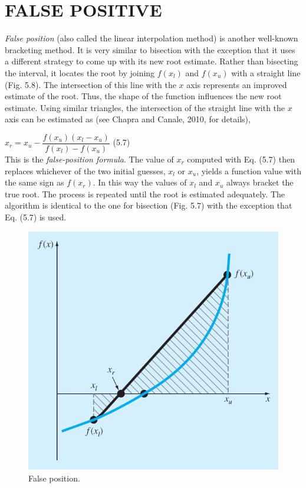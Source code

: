 \documentclass[../main.tex]{subfiles}
\begin{document}
\section[FALSE POSITIVE]{FALSE POSITIVE}
\noindent \emph{False position} (also called the linear interpolation method) is another well-known bracketing
method. It is very similar to bisection with the exception that it uses a different strategy
to come up with its new root estimate. Rather than bisecting the interval, it locates the root
by joining $f (x_l )$ and $f (x_u)$ with a straight line (Fig. 5.8). The intersection of this line with
the $x$ axis represents an improved estimate of the root. Thus, the shape of the function influences
the new root estimate. Using similar triangles, the intersection of the straight line
with the $x$ axis can be estimated as (see Chapra and Canale, 2010, for details),

$x_r = x_u - \dfrac{f(x_u)(x_l-x_u)}{f(x_l)-f(x_u)}$
\hfill (5.7)\\

This is the \emph{false-position formula}. The value of $x_r$ computed with Eq. (5.7) then replaces
whichever of the two initial guesses, $x_l$ or $x_u$, yields a function value with the same
sign as $f (x_r )$. In this way the values of $x_l$ and $x_u$ always bracket the true root. The process
is repeated until the root is estimated adequately. The algorithm is identical to the one for
bisection (Fig. 5.7) with the exception that Eq. (5.7) is used.\\
\newpage

\begin{figure}[h]
    \includegraphics[width=0.65\linewidth]{./images/fig_5_8}
    \caption{False position.}
\end{figure}
\end{document}
